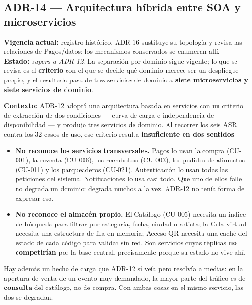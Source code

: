 
\subsection*{ADR-14 --- Arquitectura híbrida entre SOA y microservicios}

\textbf{Vigencia actual:} registro histórico. ADR-16 sustituye su topología y revisa las relaciones de Pagos/datos; los mecanismos conservados se enumeran allí.\\
\textbf{Estado:} \textit{supera a ADR-12.} La separación por dominio sigue
vigente; lo que se revisa es el \textbf{criterio} con el que se decide qué
dominio merece ser un despliegue propio, y el resultado pasa de tres servicios
de dominio a \textbf{siete microservicios y siete servicios de dominio}.

\textbf{Contexto:} ADR-12 adoptó una arquitectura basada en servicios con un
criterio de extracción de dos condiciones --- curva de carga e independencia de
disponibilidad --- y produjo tres servicios de dominio. Al recorrer los seis ASR
contra los 32 casos de uso, ese criterio resulta \textbf{insuficiente en dos
sentidos}:

\begin{itemize}
  \item \textbf{No reconoce los servicios transversales.} Pagos lo usan la
        compra (CU-001), la reventa (CU-006), los reembolsos (CU-003), los
        pedidos de alimentos (CU-011) y los parqueaderos (CU-021).
        Autenticación lo usan todas las peticiones del sistema.
        Notificaciones lo usa casi todo. Que uno de ellos falle no degrada un
        dominio: degrada muchos a la vez. ADR-12 no tenía forma de expresar eso.
  \item \textbf{No reconoce el almacén propio.} El Catálogo (CU-005) necesita un
        índice de búsqueda para filtrar por categoría, fecha, ciudad o artista;
        la Cola virtual necesita una estructura de fila en memoria; Acceso QR
        necesita una caché del estado de cada código para validar sin red. Son
        servicios cuyas réplicas \textbf{no competirían} por la base central,
        precisamente porque su estado no vive ahí.
\end{itemize}

Hay además un hecho de carga que ADR-12 sí veía pero resolvía a medias: en la
apertura de venta de un evento muy demandado, la mayor parte del tráfico es de
\textbf{consulta} del catálogo, no de compra. Con ambas cosas en el mismo
servicio, las dos se degradan.

